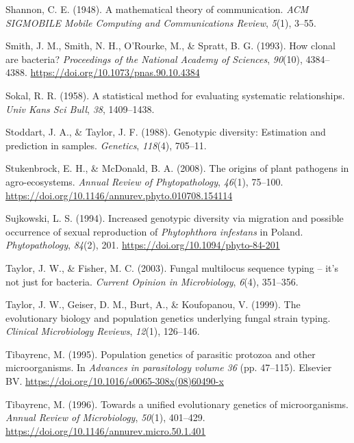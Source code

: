 \documentclass[double,11pt]{beavtex}
\begin{document}
  \hypertarget{ref-shannon2001mathematical}{}
  Shannon, C. E. (1948). A mathematical theory of communication. \emph{ACM
  SIGMOBILE Mobile Computing and Communications Review}, \emph{5}(1),
  3--55.
  
  \hypertarget{ref-smith1993how}{}
  Smith, J. M., Smith, N. H., O'Rourke, M., \& Spratt, B. G. (1993). How
  clonal are bacteria? \emph{Proceedings of the National Academy of
  Sciences}, \emph{90}(10), 4384--4388.
  \url{https://doi.org/10.1073/pnas.90.10.4384}
  
  \hypertarget{ref-sokal1958statistical}{}
  Sokal, R. R. (1958). A statistical method for evaluating systematic
  relationships. \emph{Univ Kans Sci Bull}, \emph{38}, 1409--1438.
  
  \hypertarget{ref-stoddart1988genotypic}{}
  Stoddart, J. A., \& Taylor, J. F. (1988). Genotypic diversity:
  Estimation and prediction in samples. \emph{Genetics}, \emph{118}(4),
  705--11.
  
  \hypertarget{ref-stukenbrock2008origins}{}
  Stukenbrock, E. H., \& McDonald, B. A. (2008). The origins of plant
  pathogens in agro-ecosystems. \emph{Annual Review of Phytopathology},
  \emph{46}(1), 75--100.
  \url{https://doi.org/10.1146/annurev.phyto.010708.154114}
  
  \hypertarget{ref-sujkowski1994increased}{}
  Sujkowski, L. S. (1994). Increased genotypic diversity via migration and
  possible occurrence of sexual reproduction of \emph{Phytophthora
  infestans} in Poland. \emph{Phytopathology}, \emph{84}(2), 201.
  \url{https://doi.org/10.1094/phyto-84-201}
  
  \hypertarget{ref-taylor2003fungal}{}
  Taylor, J. W., \& Fisher, M. C. (2003). Fungal multilocus sequence
  typing -- it's not just for bacteria. \emph{Current Opinion in
  Microbiology}, \emph{6}(4), 351--356.
  
  \hypertarget{ref-taylor1999evolutionary}{}
  Taylor, J. W., Geiser, D. M., Burt, A., \& Koufopanou, V. (1999). The
  evolutionary biology and population genetics underlying fungal strain
  typing. \emph{Clinical Microbiology Reviews}, \emph{12}(1), 126--146.
  
  \hypertarget{ref-tibayrenc1995population}{}
  Tibayrenc, M. (1995). Population genetics of parasitic protozoa and
  other microorganisms. In \emph{Advances in parasitology volume 36} (pp.
  47--115). Elsevier BV.
  \url{https://doi.org/10.1016/s0065-308x(08)60490-x}
  
  \hypertarget{ref-tibayrenc1996towards}{}
  Tibayrenc, M. (1996). Towards a unified evolutionary genetics of
  microorganisms. \emph{Annual Review of Microbiology}, \emph{50}(1),
  401--429. \url{https://doi.org/10.1146/annurev.micro.50.1.401}
  
\end{document}
